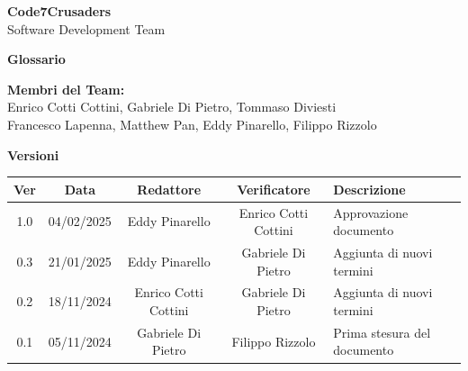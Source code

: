 \documentclass{article}
\begin{document}
\begin{titlepage}
    {\Huge \textbf{Code7Crusaders}}\\
    \vspace{0.5cm}
    {\Large Software Development Team}\\
    \vspace{2cm}
    
    \large \textbf{Glossario}
    \vspace{3.9cm}

    \textbf{Membri del Team:}\\
    Enrico Cotti Cottini, Gabriele Di Pietro, Tommaso Diviesti \\
    Francesco Lapenna, Matthew Pan, Eddy Pinarello, Filippo Rizzolo \\
    \vspace{0.5cm}
    
    \vspace{1cm}
\end{titlepage}



\newpage
\begin{center}
    \textbf{Versioni}
    \\
    \vspace{0.3cm}
    \begin{tabular}{|c|c|c|c|p{5cm}|}
        \hline
        \textbf{Ver} & \textbf{Data} & \textbf{Redattore} & \textbf{Verificatore} & \textbf{Descrizione} \\
        \hline
        1.0 & 04/02/2025 & Eddy Pinarello & Enrico Cotti Cottini & Approvazione documento \\
        0.3 & 21/01/2025 & Eddy Pinarello & Gabriele Di Pietro & Aggiunta di nuovi termini \\
        0.2 & 18/11/2024 & Enrico Cotti Cottini & Gabriele Di Pietro & Aggiunta di nuovi termini \\
        0.1 & 05/11/2024 & Gabriele Di Pietro & Filippo Rizzolo & Prima stesura del documento \\
        \hline
    \end{tabular}
\end{center}

\newpage
\tableofcontents
\newpage


\end{document}
